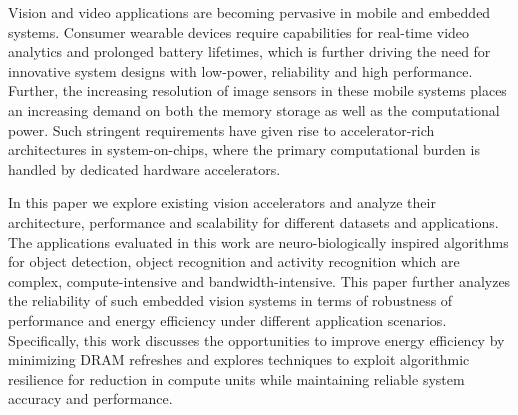 Vision and video applications are becoming pervasive in mobile and embedded systems. 
Consumer wearable devices require capabilities for real-time video analytics 
and prolonged battery lifetimes, which is further driving 
the need for innovative system designs 
with low-power, reliability and high performance. 
Further, the increasing resolution of image sensors in these mobile systems places an increasing demand on 
both the memory storage as well as the computational power. 
Such stringent requirements have given rise to accelerator-rich architectures in system-on-chips, where the 
primary computational burden is handled by dedicated hardware accelerators.
 
In this paper we explore existing vision accelerators and analyze their architecture, performance and scalability for 
different datasets and applications. The applications evaluated in this work are neuro-biologically inspired algorithms for 
object detection, object recognition and activity recognition which are complex, compute-intensive and bandwidth-intensive. 
This paper further analyzes the reliability of such embedded vision systems in terms of robustness of performance and energy 
efficiency under different application scenarios. Specifically, this work discusses the opportunities to improve energy efficiency 
by minimizing DRAM refreshes and explores techniques to exploit algorithmic resilience for reduction in compute units
while maintaining reliable system accuracy and performance.


